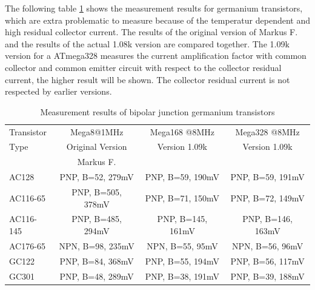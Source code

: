 The following table \ref{tab:germanium} shows the measurement results for germanium transistors, which are extra problematic
to measure because of the temperatur dependent and high residual collector current.
The results of the original version of Markus F. and the results of the actual 1.08k version are
compared together. The 1.09k version for a ATmega328 measures the current amplification factor with
common collector and common emitter circuit with respect to the collector residual current, the higher result will be shown.
The collector residual current is not respected by earlier versions.

\begin{table}[H]
  \begin{center}
    \begin{tabular}{| l | c | c | c |}
    \hline
 Transistor & Mega8@1MHz          & Mega168 @8MHz       & Mega328 @8MHz    \\
    Type    & Original Version    & Version 1.09k       & Version 1.09k  \\
            & Markus F.           &                     &        \\
    \hline
    \hline
AC128       & PNP, B=52, 279mV    & PNP, B=59, 190mV    & PNP, B=59, 191mV    \\
    \hline
AC116-65    & PNP, B=505, 378mV   & PNP, B=71, 150mV    & PNP, B=72, 149mV    \\
    \hline
AC116-145   & PNP, B=485, 294mV   & PNP, B=145, 161mV    & PNP, B=146, 163mV   \\
    \hline
AC176-65    & NPN, B=98, 235mV    & NPN, B=55, 95mV    & NPN, B=56, 96mV     \\
    \hline
GC122       & PNP, B=84, 368mV    & PNP, B=55, 194mV    & PNP, B=56, 117mV    \\
    \hline
GC301       & PNP, B=48, 289mV    & PNP, B=38, 191mV    & PNP, B=39, 188mV    \\
    \hline
    \end{tabular}
  \end{center}
  \caption{Measurement results of bipolar junction germanium transistors}
  \label{tab:germanium}
\end{table}





